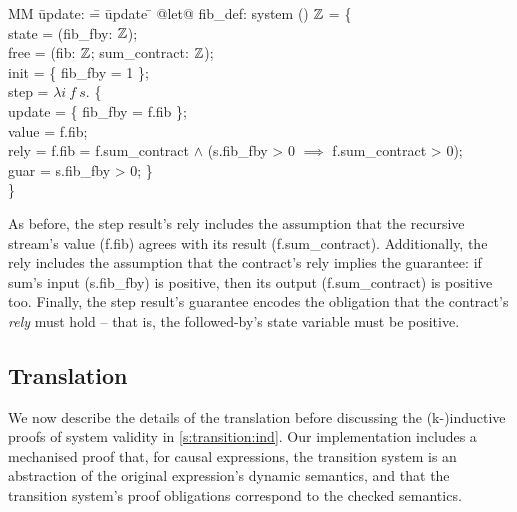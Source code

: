   \begin{tabbing}
  MM \= update: \= = \= update \= \kill
  @let@ fib_def: system () $\mathbb{Z}$ = \{ \\
  \> state   \> = (fib_fby: $\mathbb{Z}$); \\
  \> free  \> = (fib: $\mathbb{Z}$; sum_contract: $\mathbb{Z}$); \\
  \> init  \> = \{ fib_fby = 1 \}; \\
  \> step  \> = $\lambda{} i~f~s.$ \{ \\
  \> \> \> update \> = \{ fib_fby = f.fib \}; \\
  \> \> \> value  \> = f.fib; \\
  \> \> \> rely   \> = f.fib = f.sum_contract $\wedge$ (s.fib_fby > 0 $\implies$ f.sum_contract > 0); \\
  \> \> \> guar   \> = s.fib_fby > 0; \} \\
  \} \\
  \end{tabbing}

As before, the step result's rely includes the assumption that the recursive stream's value (f.fib) agrees with its result (f.sum_contract).
Additionally, the rely includes the assumption that the contract's rely implies the guarantee: if sum's input (s.fib_fby) is positive, then its output (f.sum_contract) is positive too.
Finally, the step result's guarantee encodes the obligation that the contract's \emph{rely} must hold -- that is, the followed-by's state variable must be positive.

\subsection{Translation}

We now describe the details of the translation before discussing the (k-)inductive proofs of system validity in \autoref{s:transition:ind}.
Our implementation includes a mechanised proof that, for causal expressions, the transition system is an abstraction of the original expression's dynamic semantics, and that the transition system's proof obligations correspond to the checked semantics.


